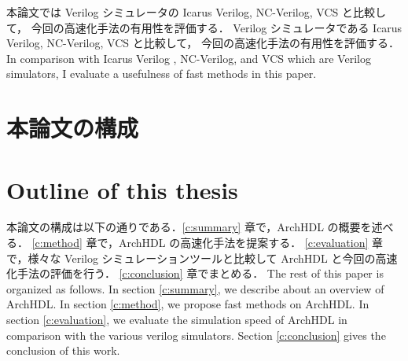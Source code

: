 本論文では Verilog シミュレータの Icarus Verilog, NC-Verilog, VCS と比較して，
今回の高速化手法の有用性を評価する．
Verilog シミュレータである Icarus Verilog, NC-Verilog, VCS と比較して，
今回の高速化手法の有用性を評価する．
\fi
In comparison with Icarus Verilog , NC-Verilog, and VCS which are Verilog simulators, I evaluate a usefulness of fast methods in this paper.

\section{本論文の構成}
\fi
\section{Outline of this thesis}

本論文の構成は以下の通りである．\ref{c:summary} 章で，ArchHDL の概要を述べる．
\ref{c:method} 章で，ArchHDL の高速化手法を提案する．
\ref{c:evaluation} 章で，様々な Verilog シミュレーションツールと比較して ArchHDL と今回の高速化手法の評価を行う．
\ref{c:conclusion} 章でまとめる．
\fi
The rest of this paper is organized as follows.
In section \ref{c:summary}, we describe about an overview of ArchHDL.
In section \ref{c:method}, we propose fast methods on ArchHDL.
In section \ref{c:evaluation}, we evaluate the simulation speed of ArchHDL in comparison with the various verilog simulators.
Section \ref{c:conclusion} gives the conclusion of this work.
